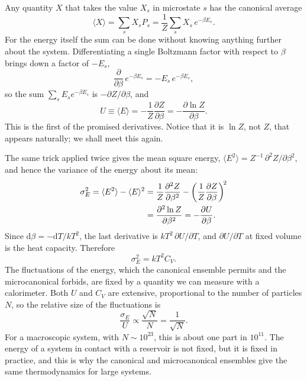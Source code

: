 \documentclass[10pt,twoside]{book}
\newcommand{\dd}{\mathrm{d}}
\begin{document}
Any quantity $X$ that takes the value $X_s$ in microstate $s$ has the canonical average
\begin{equation}
  \langle X\rangle = \sum_s X_s P_s = \frac{1}{Z}\sum_s X_s\, e^{-\beta E_s}.
\end{equation}
For the energy itself the sum can be done without knowing anything further about the system. Differentiating a single Boltzmann factor with respect to $\beta$ brings down a factor of $-E_s$,
\begin{equation}
  \frac{\partial}{\partial\beta}\, e^{-\beta E_s} = -E_s\, e^{-\beta E_s},
\end{equation}
so the sum $\sum_s E_s e^{-\beta E_s}$ is $-\partial Z/\partial\beta$, and
\begin{equation}
  U \equiv \langle E\rangle = -\frac{1}{Z}\frac{\partial Z}{\partial \beta} = -\frac{\partial \ln Z}{\partial \beta}.
\end{equation}
This is the first of the promised derivatives. Notice that it is $\ln Z$, not $Z$, that appears naturally; we shall meet this again.

The same trick applied twice gives the mean square energy, $\langle E^2\rangle = Z^{-1}\,\partial^2 Z/\partial\beta^2$, and hence the variance of the energy about its mean:
\begin{align}
  \sigma_E^2 = \langle E^2\rangle - \langle E\rangle^2
  &= \frac{1}{Z}\frac{\partial^2 Z}{\partial\beta^2} - \left(\frac{1}{Z}\frac{\partial Z}{\partial\beta}\right)^{\!2} \notag\\
  &= \frac{\partial^2 \ln Z}{\partial \beta^2} = -\frac{\partial U}{\partial \beta}.
\end{align}
Since $\dd\beta = -\dd T/kT^2$, the last derivative is $kT^2\,\partial U/\partial T$, and $\partial U/\partial T$ at fixed volume is the heat capacity. Therefore
\begin{equation}
  \sigma_E^2 = kT^2 C_V .
\end{equation}
The fluctuations of the energy, which the canonical ensemble permits and the microcanonical forbids, are fixed by a quantity we can measure with a calorimeter. Both $U$ and $C_V$ are extensive, proportional to the number of particles $N$, so the relative size of the fluctuations is
\begin{equation}
  \frac{\sigma_E}{U} \propto \frac{\sqrt{N}}{N} = \frac{1}{\sqrt{N}} .
\end{equation}
For a macroscopic system, with $N \sim 10^{23}$, this is about one part in $10^{11}$. The energy of a system in contact with a reservoir is not fixed, but it is fixed in practice, and this is why the canonical and microcanonical ensembles give the same thermodynamics for large systems.
\end{document}
